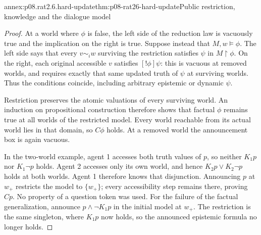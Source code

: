 \begin{annexitem}{annex:p08.rat2.6.hard-update}{thm:p08-rat26-hard-update}{Public restriction, knowledge and the dialogue model}
\begin{proof}
At a world where \(\phi\) is false, the left side of the reduction
law is vacuously true and the implication on the right is true. Suppose
instead that \(M,w\models\phi\). The left side says that every
\(v\sim_i w\) surviving the restriction satisfies \(\psi\) in
\(M\upharpoonright\phi\). On the right, each original accessible
\(v\) satisfies \([!\phi]\psi\): this is vacuous at removed
worlds, and requires exactly that same updated truth of \(\psi\)
at surviving worlds. Thus the conditions coincide, including arbitrary
epistemic or dynamic \(\psi\).

Restriction preserves the atomic valuations of every surviving world.
An induction on propositional construction therefore shows that factual
\(\phi\) remains true at all worlds of the restricted model. Every
world reachable from its actual world lies in that domain, so \(C\phi\)
holds. At a removed world the announcement box is again vacuous.

In the two-world example, agent 1 accesses both truth values of \(p\),
so neither \(K_1p\) nor \(K_1\neg p\) holds. Agent 2 accesses
only its own world, and hence \(K_2p\vee K_2\neg p\) holds at
both worlds. Agent 1 therefore knows that disjunction. Announcing \(p\)
at \(w_+\) restricts the model to \(\{w_+\}\); every accessibility
step remains there, proving \(Cp\). No property of a question token
was used. For the failure of the factual generalization, announce
\(p\wedge\neg K_1p\) in the initial model at \(w_+\).
The restriction is the same singleton, where \(K_1p\) now holds,
so the announced epistemic formula no longer holds.
\end{proof}
\end{annexitem}

